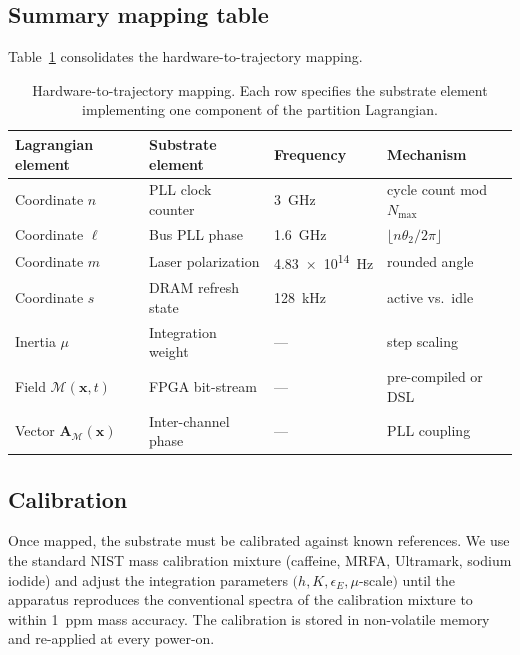 \documentclass[twocolumn,11pt,a4paper]{article}
\theoremstyle{definition}
\theoremstyle{remark}
\newcommand{\Depth}{\mathcal{M}}
\newcommand{\Apartition}{\mathbf{A}_{\mathcal{M}}}
\newcommand{\partinert}{\mu}
\begin{document}
\subsection{Summary mapping table}

Table~\ref{tab:mapping} consolidates the hardware-to-trajectory mapping.

\begin{table}[H]
\centering
\caption{Hardware-to-trajectory mapping. Each row specifies the substrate element implementing one component of the partition Lagrangian.}
\label{tab:mapping}
\small
\begin{tabular}{llll}
\toprule
\textbf{Lagrangian element} & \textbf{Substrate element} & \textbf{Frequency} & \textbf{Mechanism} \\
\midrule
Coordinate $n$ & PLL clock counter & \SI{3}{GHz} & cycle count mod $N_{\max}$ \\
Coordinate $\ell$ & Bus PLL phase & \SI{1.6}{GHz} & $\lfloor n\theta_2/2\pi\rfloor$ \\
Coordinate $m$ & Laser polarization & \SI{4.83e14}{Hz} & rounded angle \\
Coordinate $s$ & DRAM refresh state & \SI{128}{kHz} & active vs.\ idle \\
Inertia $\partinert$ & Integration weight & --- & step scaling \\
Field $\Depth(\mathbf{x},t)$ & FPGA bit-stream & --- & pre-compiled or DSL \\
Vector $\Apartition(\mathbf{x})$ & Inter-channel phase & --- & PLL coupling \\
\bottomrule
\end{tabular}
\end{table}

\subsection{Calibration}

Once mapped, the substrate must be calibrated against known references. We use the standard NIST mass calibration mixture (caffeine, MRFA, Ultramark, sodium iodide) \citep{nist2020srm1953,gross2017} and adjust the integration parameters $(h, K, \epsilon_E, \partinert$-scale$)$ until the apparatus reproduces the conventional spectra of the calibration mixture to within \SI{1}{ppm} mass accuracy. The calibration is stored in non-volatile memory and re-applied at every power-on.

\end{document}
